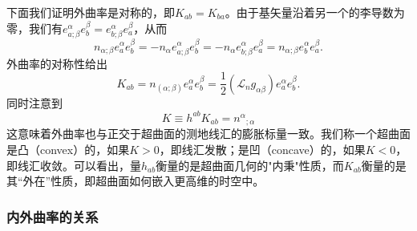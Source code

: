 \documentclass[hyperref, UTF8, a4paper]{ctexart}
\begin{document}
下面我们证明外曲率是对称的，即$K_{ab} =K_{ba}$。由于基矢量沿着另一个的李导数为零，我们有$e_{a;\beta }^{\alpha } e_{b}^{\beta } =e_{b;\beta }^{\alpha } e_{a}^{\beta }$，从而
\begin{equation*}
	n_{\alpha ;\beta } e_{a}^{\alpha } e_{b}^{\beta } =-n_{\alpha } e_{a;\beta }^{\alpha } e_{b}^{\beta } =-n_{\alpha } e_{b;\beta }^{\alpha } e_{a}^{\beta } =n_{\alpha ;\beta } e_{b}^{\alpha } e_{a}^{\beta } .
\end{equation*}
外曲率的对称性给出
\begin{equation*}
	K_{ab} =n_{( \alpha ;\beta )} e_{a}^{\alpha } e_{b}^{\beta } =\frac{1}{2}(\mathcal{L}_{n} g_{\alpha \beta }) e_{a}^{\alpha } e_{b}^{\beta } .
\end{equation*}
同时注意到
\begin{equation*}
	K\equiv h^{ab} K_{ab} =n^{\alpha }{}_{;\alpha }
\end{equation*}
这意味着外曲率也与正交于超曲面的测地线汇的膨胀标量一致。我们称一个超曲面是凸（convex）的，如果$K >0$，即线汇发散；是凹（concave）的，如果$K< 0$，即线汇收敛。可以看出，量$h_{ab}$衡量的是超曲面几何的"内秉"性质，而$K_{ab}$衡量的是其“外在”性质，即超曲面如何嵌入更高维的时空中。


\subsubsection{内外曲率的关系}
\end{document}
